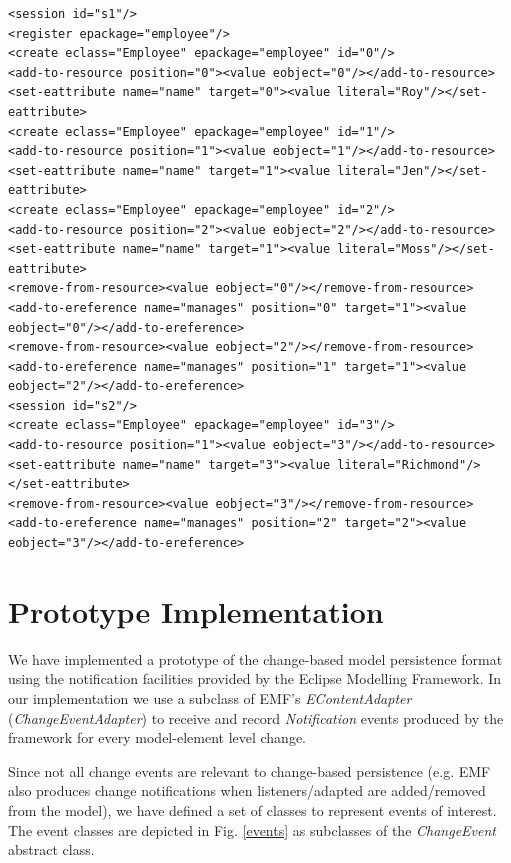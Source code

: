 \documentclass{llncs}
\begin{document}
\begin{lstlisting}[style=xml,caption={Change-based representation of the model of Figure \ref{image2}.},label=cbpmodel1]
<session id="s1"/>
<register epackage="employee"/>
<create eclass="Employee" epackage="employee" id="0"/>
<add-to-resource position="0"><value eobject="0"/></add-to-resource>
<set-eattribute name="name" target="0"><value literal="Roy"/></set-eattribute>
<create eclass="Employee" epackage="employee" id="1"/>
<add-to-resource position="1"><value eobject="1"/></add-to-resource>
<set-eattribute name="name" target="1"><value literal="Jen"/></set-eattribute>
<create eclass="Employee" epackage="employee" id="2"/>
<add-to-resource position="2"><value eobject="2"/></add-to-resource>
<set-eattribute name="name" target="1"><value literal="Moss"/></set-eattribute>
<remove-from-resource><value eobject="0"/></remove-from-resource>
<add-to-ereference name="manages" position="0" target="1"><value eobject="0"/></add-to-ereference>
<remove-from-resource><value eobject="2"/></remove-from-resource>
<add-to-ereference name="manages" position="1" target="1"><value eobject="2"/></add-to-ereference>
<session id="s2"/>
<create eclass="Employee" epackage="employee" id="3"/>
<add-to-resource position="1"><value eobject="3"/></add-to-resource>
<set-eattribute name="name" target="3"><value literal="Richmond"/></set-eattribute>
<remove-from-resource><value eobject="3"/></remove-from-resource>
<add-to-ereference name="manages" position="2" target="2"><value eobject="3"/></add-to-ereference>
\end{lstlisting}

\section{Prototype Implementation}
\label{Prototype Implementation}
We have implemented a prototype of the change-based model persistence format using the notification facilities provided by the Eclipse Modelling Framework. In our implementation we use a subclass of EMF's \emph{EContentAdapter} (\emph{ChangeEventAdapter}) to receive and record \emph{Notification} events produced by the framework for every model-element level change.

Since not all change events are relevant to change-based persistence (e.g. EMF also produces change notifications when listeners/adapted are added/removed from the model), we have defined a set of classes to represent events of interest. The event classes are depicted in Fig. \ref{events} as subclasses of the \emph{ChangeEvent} abstract class.  %
\end{document}
